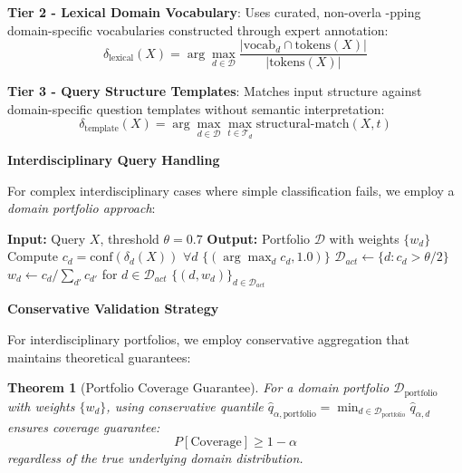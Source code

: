\documentclass{uai2026} %
\theoremstyle{remark}
\theoremstyle{plain}
\newtheorem{theorem}{Theorem} %
\theoremstyle{definition}
\begin{document}
\textbf{Tier 2 - Lexical Domain Vocabulary}: Uses curated, non-overla
-pping domain-specific vocabularies constructed through expert annotation:
\begin{equation}
\delta_{\text{lexical}}(X) = \arg\max_{d \in \mathcal{D}} \frac{|\text{vocab}_d \cap \text{tokens}(X)|}{|\text{tokens}(X)|}
\end{equation}

\textbf{Tier 3 - Query Structure Templates}: Matches input structure against domain-specific question templates without semantic interpretation:
\begin{equation}
\delta_{\text{template}}(X) = \arg\max_{d \in \mathcal{D}} \max_{t \in \mathcal{T}_d} \text{structural-match}(X, t)
\end{equation}

\textbf{Interdisciplinary Query Handling}

For complex interdisciplinary cases where simple classification fails, we employ a \emph{domain portfolio approach}:

\begin{algorithm}[htb]
\caption{Domain Portfolio Construction}
\label{alg:domain-portfolio}
\scriptsize
\begin{algorithmic}[1]
\STATE \textbf{Input:} Query $X$, threshold $\theta = 0.7$
\STATE \textbf{Output:} Portfolio $\mathcal{D}$ with weights $\{w_d\}$
\STATE Compute $c_d = \text{conf}(\delta_d(X))$ $\forall d$
    \RETURN $\{(\arg\max_d c_d, 1.0)\}$
\ELSE
    \STATE $\mathcal{D}_{act} \leftarrow \{d : c_d > \theta/2\}$
    \STATE $w_d \leftarrow c_d / \sum_{d'} c_{d'}$ for $d \in \mathcal{D}_{act}$
    \RETURN $\{(d, w_d)\}_{d \in \mathcal{D}_{act}}$
\ENDIF
\end{algorithmic}
\end{algorithm}

\textbf{Conservative Validation Strategy}

For interdisciplinary portfolios, we employ conservative aggregation that maintains theoretical guarantees:

\begin{theorem}[Portfolio Coverage Guarantee]
\label{thm:portfolio-coverage}
For a domain portfolio $\mathcal{D}_{\text{portfolio}}$ with weights $\{w_d\}$, using conservative quantile $\hat{q}_{\alpha,\text{portfolio}} = \min_{d \in \mathcal{D}_{\text{portfolio}}} \hat{q}_{\alpha,d}$ ensures coverage guarantee:
\begin{equation}
P[\text{Coverage}] \geq 1-\alpha
\end{equation}
regardless of the true underlying domain distribution.
\end{theorem}
\end{document}
